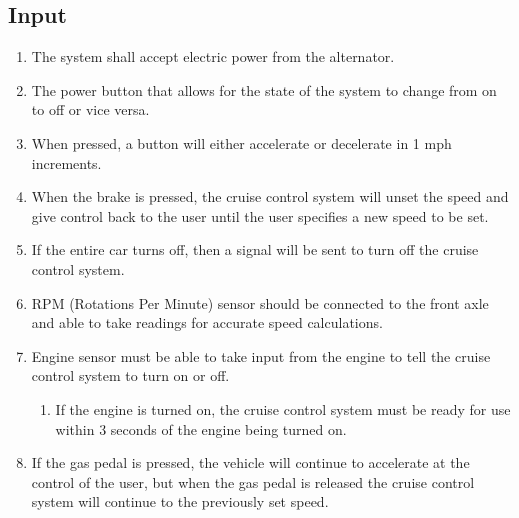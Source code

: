 \documentclass[preprint,11pt,3p]{article}
\begin{document}
\subsection{Input}
\begin{enumerate}
	\item The system shall accept electric power from the alternator.
	\item The power button that allows for the state of the system to change from on to off or vice versa.
	\item When pressed, a button will either accelerate or decelerate in 1 mph increments. 
	\item When the brake is pressed, the cruise control system will unset the speed and give control back to the user until the user specifies a new speed to be set.
	\item If the entire car turns off, then a signal will be sent to turn off the cruise control system.
	\item RPM (Rotations Per Minute) sensor should be connected to the front axle and able to take readings for accurate speed calculations. 
	\item Engine sensor must be able to take input from the engine to tell the cruise control system to turn on or off.
		\begin{enumerate}
			\item If the engine is turned on, the cruise control system must be ready for use within 3 seconds of the engine being turned on.
		\end{enumerate}
	\item If the gas pedal is pressed, the vehicle will continue to accelerate at the control of the user, but when the gas pedal is released the cruise control system will continue to the previously set speed.
\end{enumerate}
\end{document}
